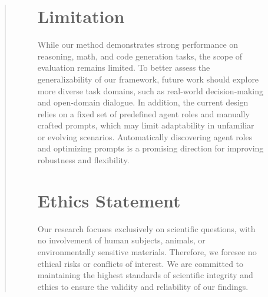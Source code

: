 \documentclass[11pt]{article}
\begin{document}
\begin{abstract}
\begin{figure}[ht!]
\section*{Limitation}
While our method demonstrates strong performance on reasoning, math, and code generation tasks, the scope of evaluation remains limited. To better assess the generalizability of our framework, future work should explore more diverse task domains, such as real-world decision-making and open-domain dialogue. In addition, the current design relies on a fixed set of predefined agent roles and manually crafted prompts, which may limit adaptability in unfamiliar or evolving scenarios. Automatically discovering agent roles and optimizing prompts is a promising direction for improving robustness and flexibility.
\section*{Ethics Statement}
Our research focuses exclusively on scientific questions, with no involvement of human subjects, animals, or environmentally sensitive materials. Therefore, we foresee no ethical risks or conflicts of interest. We are committed to maintaining the highest standards of scientific integrity and ethics to ensure the validity and reliability of our findings.

\end{figure}
\end{abstract}
\end{document}
